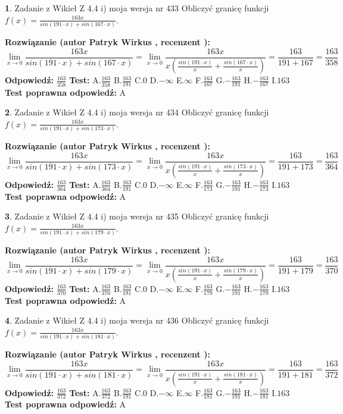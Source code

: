 \documentclass[12pt, a4paper]{article}
\theoremstyle{definition} %
\newtheorem{zad}{}
\newcommand{\zadStart}[1]{\begin{zad}#1\newline}
\newcommand{\zadStop}{\end{zad}}
\newcommand{\rozwStart}[2]{\noindent \textbf{Rozwiązanie (autor #1 , recenzent #2): }\newline}
\newcommand{\rozwStop}{\newline}
\newcommand{\odpStart}{\noindent \textbf{Odpowiedź:}\newline}
\newcommand{\odpStop}{\newline}
\newcommand{\testStart}{\noindent \textbf{Test:}\newline}
\newcommand{\testStop}{\newline}
\newcommand{\kluczStart}{\noindent \textbf{Test poprawna odpowiedź:}\newline}
\newcommand{\kluczStop}{\newline}
\begin{document}
\zadStart{Zadanie z Wikieł Z 4.4 i) moja wersja nr 433}
Obliczyć granicę funkcji $f(x)=\frac{163x}{sin(191\cdot x) +sin(167\cdot x)}$.
\zadStop
\rozwStart{Patryk Wirkus}{}
$$\lim\limits_{x\to 0}\frac{163x}{sin(191\cdot x) +sin(167\cdot x)}=\lim\limits_{x\to 0}\frac{163x}{x(\frac{sin(191\cdot x)}{x}+\frac{sin(167\cdot x)}{x})}=\frac{163}{191+167} = \frac{163}{358}$$
\rozwStop
\odpStart
$\frac{163}{358}$
\odpStop
\testStart
A.$\frac{163}{358}$
B.$\frac{163}{191}$
C.$0$
D.$-\infty$
E.$\infty$
F.$\frac{163}{167}$
G.$-\frac{163}{191}$
H.$-\frac{163}{167}$
I.$163$
\testStop
\kluczStart
A
\kluczStop



\zadStart{Zadanie z Wikieł Z 4.4 i) moja wersja nr 434}
Obliczyć granicę funkcji $f(x)=\frac{163x}{sin(191\cdot x) +sin(173\cdot x)}$.
\zadStop
\rozwStart{Patryk Wirkus}{}
$$\lim\limits_{x\to 0}\frac{163x}{sin(191\cdot x) +sin(173\cdot x)}=\lim\limits_{x\to 0}\frac{163x}{x(\frac{sin(191\cdot x)}{x}+\frac{sin(173\cdot x)}{x})}=\frac{163}{191+173} = \frac{163}{364}$$
\rozwStop
\odpStart
$\frac{163}{364}$
\odpStop
\testStart
A.$\frac{163}{364}$
B.$\frac{163}{191}$
C.$0$
D.$-\infty$
E.$\infty$
F.$\frac{163}{173}$
G.$-\frac{163}{191}$
H.$-\frac{163}{173}$
I.$163$
\testStop
\kluczStart
A
\kluczStop



\zadStart{Zadanie z Wikieł Z 4.4 i) moja wersja nr 435}
Obliczyć granicę funkcji $f(x)=\frac{163x}{sin(191\cdot x) +sin(179\cdot x)}$.
\zadStop
\rozwStart{Patryk Wirkus}{}
$$\lim\limits_{x\to 0}\frac{163x}{sin(191\cdot x) +sin(179\cdot x)}=\lim\limits_{x\to 0}\frac{163x}{x(\frac{sin(191\cdot x)}{x}+\frac{sin(179\cdot x)}{x})}=\frac{163}{191+179} = \frac{163}{370}$$
\rozwStop
\odpStart
$\frac{163}{370}$
\odpStop
\testStart
A.$\frac{163}{370}$
B.$\frac{163}{191}$
C.$0$
D.$-\infty$
E.$\infty$
F.$\frac{163}{179}$
G.$-\frac{163}{191}$
H.$-\frac{163}{179}$
I.$163$
\testStop
\kluczStart
A
\kluczStop



\zadStart{Zadanie z Wikieł Z 4.4 i) moja wersja nr 436}
Obliczyć granicę funkcji $f(x)=\frac{163x}{sin(191\cdot x) +sin(181\cdot x)}$.
\zadStop
\rozwStart{Patryk Wirkus}{}
$$\lim\limits_{x\to 0}\frac{163x}{sin(191\cdot x) +sin(181\cdot x)}=\lim\limits_{x\to 0}\frac{163x}{x(\frac{sin(191\cdot x)}{x}+\frac{sin(181\cdot x)}{x})}=\frac{163}{191+181} = \frac{163}{372}$$
\rozwStop
\odpStart
$\frac{163}{372}$
\odpStop
\testStart
A.$\frac{163}{372}$
B.$\frac{163}{191}$
C.$0$
D.$-\infty$
E.$\infty$
F.$\frac{163}{181}$
G.$-\frac{163}{191}$
H.$-\frac{163}{181}$
I.$163$
\testStop
\kluczStart
A
\kluczStop
\end{document}
